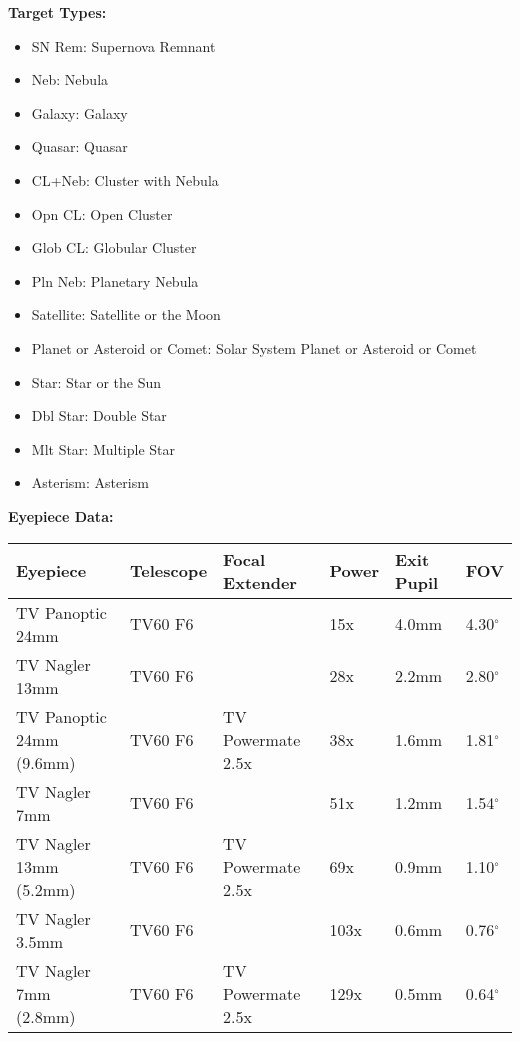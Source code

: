 \bigskip
{\bf Target Types:}
\begin{itemize}
\renewcommand\labelitemi{--}
\item SN Rem: Supernova Remnant
\item Neb: Nebula
\item Galaxy: Galaxy
\item Quasar: Quasar
\item CL+Neb: Cluster with Nebula
\item Opn CL: Open Cluster
\item Glob CL: Globular Cluster
\item Pln Neb: Planetary Nebula
\item Satellite: Satellite or the Moon
\item Planet or Asteroid or Comet: Solar System Planet or Asteroid or Comet
\item Star: Star or the Sun
\item Dbl Star: Double Star
\item Mlt Star: Multiple Star
\item Asterism: Asterism
\end{itemize}


\newpage
{\bf Eyepiece Data:}
\begin{longtable}{@{}llllll@{}}
\hline
{\bf Eyepiece} & {\bf Telescope} & {\bf Focal Extender} & {\bf Power} & {\bf Exit Pupil} & {\bf FOV}\\
\hline
TV Panoptic 24mm & TV60 F6 & & 15x & 4.0mm & 4.30$^{\circ}$ \\
TV Nagler 13mm & TV60 F6 & & 28x & 2.2mm & 2.80$^{\circ}$ \\
TV Panoptic 24mm (9.6mm)& TV60 F6 & TV Powermate 2.5x & 38x & 1.6mm & 1.81$^{\circ}$ \\
TV Nagler 7mm & TV60 F6 & & 51x & 1.2mm & 1.54$^{\circ}$ \\
TV Nagler 13mm (5.2mm)& TV60 F6 & TV Powermate 2.5x & 69x & 0.9mm & 1.10$^{\circ}$ \\
TV Nagler 3.5mm & TV60 F6 & & 103x & 0.6mm & 0.76$^{\circ}$ \\
TV Nagler 7mm (2.8mm)& TV60 F6 & TV Powermate 2.5x & 129x & 0.5mm & 0.64$^{\circ}$ \\
\hline
\end{longtable}
